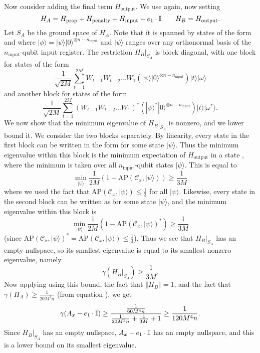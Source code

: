 \documentclass[../thesis-main/thesis-main]{subfiles}
\begin{document}
Now consider adding the final term $H_{\mathrm{output}}$. We use  again, now setting 
\[
H_{A}=H_{\text{prop}}+H_{\mathrm{penalty}}+H_{\mathrm{input}}-e_{1}\cdot\mathbb{I}\qquad H_{B}=H_{\mathrm{output}}.
\]
Let $S_{A}$ be the ground space of $H_{A}$. Note that it is spanned by states of the form  and  where $|\phi\rangle=|\psi\rangle|0\rangle^{\otimes n-n_{\text{input}}}$ and $|\psi\rangle$ ranges over any orthonormal basis of the $n_{\text{input}}$-qubit input register. The restriction $H_{B}|_{S_{A}}$ is block diagonal, with one block for states of the form 
\begin{equation}
\frac{1}{\sqrt{2M}}\sum_{t=1}^{2M}W_{t-1}W_{t-2}\ldots W_{1}\left(|\psi\rangle|0\rangle^{\otimes n-n_{\text{input}}}\right)|t\rangle|\omega\rangle\label{eq:block1}
\end{equation}
and another block for states of the form 
\begin{equation}
\frac{1}{\sqrt{2M}}\sum_{t=1}^{2M}\left(W_{t-1}W_{t-2}\ldots W_{1}\right)^{*}\left(|\psi\rangle^{*}|0\rangle^{\otimes n-n_{\text{input}}}\right)|t\rangle|\omega^{*}\rangle.\label{eq:block2}
\end{equation}
We now show that the minimum eigenvalue of $H_{B}|_{S_{A}}$ is nonzero, and we lower bound it. We consider the two blocks separately. By linearity, every state in the first block can be written in the form  for some state $|\psi\rangle$. Thus the minimum eigenvalue within this block is the minimum expectation of $H_{\text{output}}$ in a state , where the minimum is taken over all $n_{\text{input}}$-qubit states $|\psi\rangle$. This is equal to 
\[
\min_{|\psi\rangle}\frac{1}{2M}\left(1-\text{AP}(\mathcal{C}_{x},|\psi\rangle)\right)\geq\frac{1}{3M}
\]
where we used the fact that $\text{AP}\left(\mathcal{C}_{x},|\psi\rangle\right)\leq\frac{1}{3}$ for all $|\psi\rangle$. Likewise, every state in the second block can be written as  for some state $|\psi\rangle$, and the minimum eigenvalue within this block is 
\[
\min_{|\psi\rangle}\frac{1}{2M}\left(1-\text{AP}(\mathcal{C}_{x},|\psi\rangle)^{*}\right)\geq\frac{1}{3M}
\]
(since $\text{AP}(\mathcal{C}_{x},|\psi\rangle)^{*}=\text{AP}(\mathcal{C}_{x},|\psi\rangle)\leq\frac{1}{3}$). Thus we see that $H_{B}|_{S_{A}}$ has an empty nullspace, so its smallest eigenvalue is equal to its smallest nonzero eigenvalue, namely 
\[
\gamma(H_{B}|_{S_{A}})\geq\frac{1}{3M}.
\]
Now applying  using this bound, the fact that $\left\Vert H_{B}\right\Vert =1$, and the fact that $\gamma(H_{A})\geq\frac{1}{20M^{3}n}$ (from equation ), we get 
\[
\gamma(A_{x}-e_{1}\cdot\mathbb{I})\geq\frac{\frac{1}{60M^{4}n}}{\frac{1}{20M^{3}n}+\frac{1}{3M}+1}\geq\frac{1}{120M^{4}n}.
\]
Since $H_{B}|_{S_{A}}$ has an empty nullspace, $A_{x}-e_{1}\cdot\mathbb{I}$ has an empty nullspace, and this is a lower bound on its smallest eigenvalue.
\end{document}
